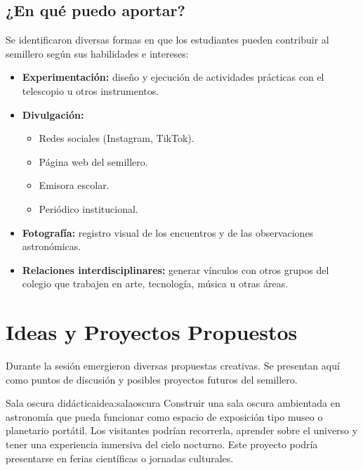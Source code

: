 \subsection{¿En qué puedo aportar?}

Se identificaron diversas formas en que los estudiantes pueden contribuir al semillero
según sus habilidades e intereses:

\begin{itemize}[leftmargin=1.5em]
    \item \textbf{Experimentación:} diseño y ejecución de actividades prácticas con el
          telescopio u otros instrumentos.
    \item \textbf{Divulgación:}
        \begin{itemize}
            \item Redes sociales (Instagram, TikTok).
            \item Página web del semillero.
            \item Emisora escolar.
            \item Periódico institucional.
        \end{itemize}
    \item \textbf{Fotografía:} registro visual de los encuentros y de las observaciones
          astronómicas.
    \item \textbf{Relaciones interdisciplinares:} generar vínculos con otros grupos del
          colegio que trabajen en arte, tecnología, música u otras áreas.
\end{itemize}

\section{Ideas y Proyectos Propuestos}

Durante la sesión emergieron diversas propuestas creativas. Se presentan aquí como
puntos de discusión y posibles proyectos futuros del semillero.

\begin{idea}{Sala oscura didáctica}{idea:salaoscura}
    Construir una sala oscura ambientada en astronomía que pueda funcionar como espacio
    de exposición tipo museo o planetario portátil. Los visitantes podrían recorrerla,
    aprender sobre el universo y tener una experiencia inmersiva del cielo nocturno.
    Este proyecto podría presentarse en ferias científicas o jornadas culturales.
\end{idea}

